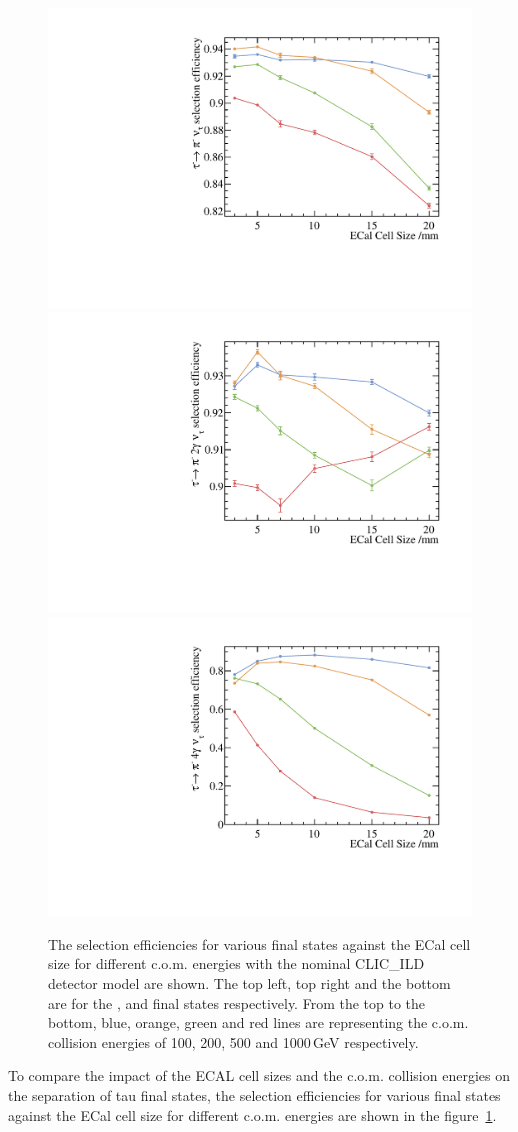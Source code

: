 \documentclass[a4paper,11pt]{article}
\begin{document}
\begin{figure}[htbp]
\centering %
\includegraphics[width=.4\textwidth]{plots/pionSel}
\qquad
\includegraphics[width=.4\textwidth]{plots/pion2photon}
\qquad
\includegraphics[width=.4\textwidth]{plots/pion4photon}
\caption{\label{fig:pion_efficiency} The selection efficiencies for various final states against the ECal cell size for different c.o.m. energies with the nominal CLIC\_ILD detector model are shown. The top left, top right and the bottom are for the \Ppiminus\Pnut, \Pphoton\Pnut and  \Pphoton\Pnut final states respectively. From the top to the bottom, blue, orange, green and red lines are representing the c.o.m. \Pelectron\APelectron collision energies of 100, 200, 500 and 1000\,GeV respectively.}
\end{figure}

To compare the impact of the ECAL cell sizes and the c.o.m. \Pelectron\APelectron collision energies on the separation of tau final states, the selection efficiencies for various final states against the ECal cell size for different c.o.m. energies are shown in the figure~\ref{fig:pion_efficiency}. 
\end{document}
